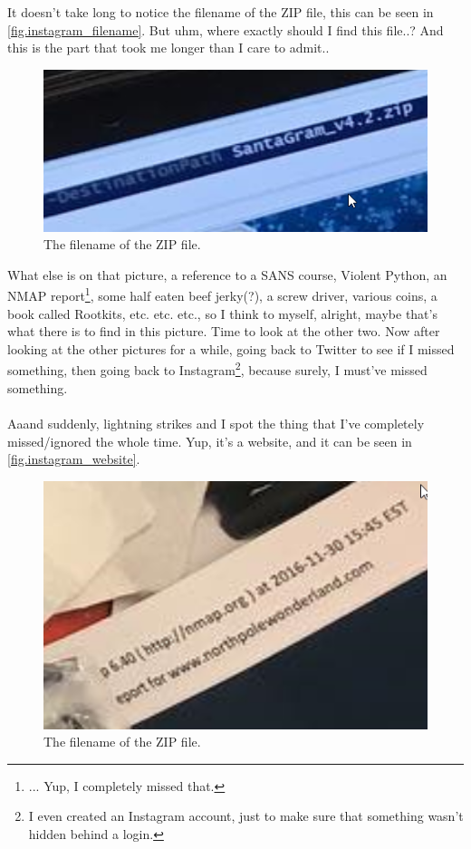 \documentclass[writeup.tex]{subfiles}
\begin{document}
		It doesn't take long to notice the filename of the ZIP file, this can be seen in \autoref{fig.instagram_filename}. But uhm, where exactly should I find this file..? And this is the part that took me longer than I care to admit..\\
		
		\begin{figure}[H]
			\centering
			\includegraphics[scale=0.8]{screenshots/instagram_zip_filename}
			\caption{The filename of the ZIP file.}
			\label{fig.instagram_filename}
		\end{figure}
		
		What else is on that picture, a reference to a SANS course, Violent Python, an NMAP report\footnote{... Yup, I completely missed that.}, some half eaten beef jerky(?), a screw driver, various coins, a book called Rootkits, etc. etc. etc., so I think to myself, alright, maybe that's what there is to find in this picture. Time to look at the other two. Now after looking at the other pictures for a while, going back to Twitter to see if I missed something, then going back to Instagram\footnote{I even created an Instagram account, just to make sure that something wasn't hidden behind a login.}, because surely, I must've missed something.\\
		\\
		Aaand suddenly, lightning strikes and I spot the thing that I've completely missed/ignored the whole time. Yup, it's a website, and it can be seen in \autoref{fig.instagram_website}.

		\begin{figure}[H]
			\centering
			\includegraphics[scale=1]{screenshots/instagram_nmap_report}
			\caption{The filename of the ZIP file.}
			\label{fig.instagram_website}
		\end{figure}
		
\end{document}
